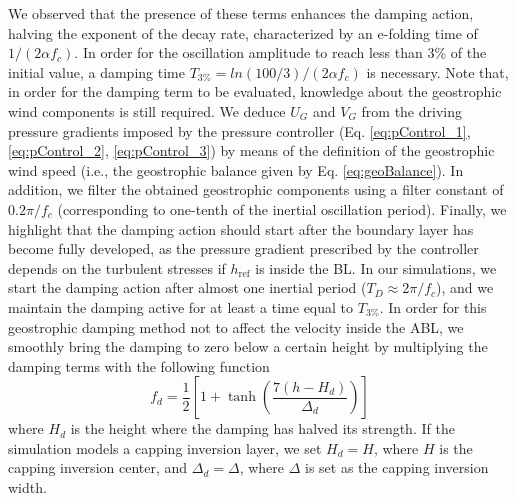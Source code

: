 \documentclass[journal abbreviation, manuscript]{copernicus}
\begin{document}
We observed that the presence of these terms enhances the damping action, halving the exponent of the decay rate, characterized by an e-folding time of $1/(2\alpha f_c)$. In order for the oscillation amplitude to reach less than 3\% of the initial value, a damping time $T_{3\%}=ln(100/3)/(2 \alpha f_c)$ is necessary. Note that, in order for the damping term to be evaluated, knowledge about the geostrophic wind components is still required. We deduce $U_G$ and $V_G$ from the driving pressure gradients imposed by the pressure controller (Eq. \ref{eq:pControl_1}, \ref{eq:pControl_2}, \ref{eq:pControl_3}) by means of the definition of the geostrophic wind speed (i.e., the geostrophic balance given by Eq. \ref{eq:geoBalance}). In addition, we filter the obtained geostrophic components using a filter constant of $0.2\pi/f_c$ (corresponding to one-tenth of the inertial oscillation period). Finally, we highlight that the damping action should start after the boundary layer has become fully developed, as the pressure gradient prescribed by the controller depends on the turbulent stresses if $h_\text{ref}$ is inside the BL. In our simulations, we start the damping action after almost one inertial period ($T_D\approx2\pi/f_c$), and we maintain the damping active for at least a time equal to $T_{3\%}$. In order for this geostrophic damping method not to affect the velocity inside the ABL, we smoothly bring the damping to zero below a certain height by multiplying the damping terms with the following function
\begin{equation}
	f_d = \frac{1}{2}\left[1 + \tanh\left(\frac{7(h-H_d)}{\Delta_d}\right)\right]
	\label{eq:geoDampingFunction}
\end{equation}
where $H_d$ is the height where the damping has halved its strength. 
If the simulation models a capping inversion layer, we set $H_d = H$, where $H$ is the capping inversion center, and $\Delta_d = \Delta$, where $\Delta$ is set as the capping inversion width. 
\end{document}
